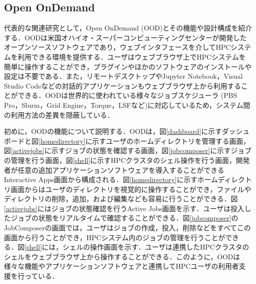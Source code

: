 \subsection{Open OnDemand}
代表的な関連研究として，Open OnDemand (OOD)とその機能や設計構成を紹介する\cite{cite2,cite3}．OODは米国オハイオ・スーパーコンピューティングセンターが開発したオープンソースソフトウェアであり，ウェブインタフェースを介してHPCシステムを利用できる環境を提供する．ユーザはウェブブラウザ上でHPCシステムを簡単に操作することができ，プラグインやほかのソフトウェアのインストールや設定は不要である．また，リモートデスクトップやJupyter Notebook\cite{jupyternotebook}，Visual Studio Codeなどの対話的アプリケーションもウェブブラウザ上から利用することができる．OODは世界的に使われている様々なジョブスケジューラ (PBS Pro\cite{PBS_Pro}，Slurm\cite{Slurm}，Grid Engine\cite{Grid_Engine}，Torque\cite{TORQUE}，LSF\cite{LSF}など)に対応しているため，システム間の利用方法の差異を隠蔽している．\par
初めに，OODの機能について説明する．OODは，図\ref{dashboard}に示すダッシュボードと図\ref{homedirectory}に示すユーザのホームディレクトリを管理する画面，図\ref{activejobs}に示すジョブの状態を確認する画面，図\ref{jobcomposer}に示すジョブの管理を行う画面，図\ref{shell}に示すHPCクラスタのシェル操作を行う画面，開発者が任意の追加アプリケーションソフトウェアを導入することができるInteractive Apps画面から構成される．図\ref{homedirectory}に示すホームディレクトリ画面からはユーザのディレクトリを視覚的に操作することができ，ファイルやディレクトリの削除，追加，および編集なども容易に行うことができる．図\ref{activejobs}にはジョブの状態確認を行うActive Jobs画面を示す．ユーザは投入したジョブの状態をリアルタイムで確認することができる．図\ref{jobcomposer}のJobComposerの画面では，ユーザはジョブの作成，投入，削除などをすべてこの画面から行うことができ，HPCシステム内のジョブの管理を行うことができる．図\ref{shell}には，シェルの操作画面を示す．ユーザは連携したHPCクラスタのシェルをウェブブラウザ上から操作することができる．このように，OODは様々な機能やアプリケーションソフトウェアと連携してHPCユーザの利用者支援を行っている．\par
